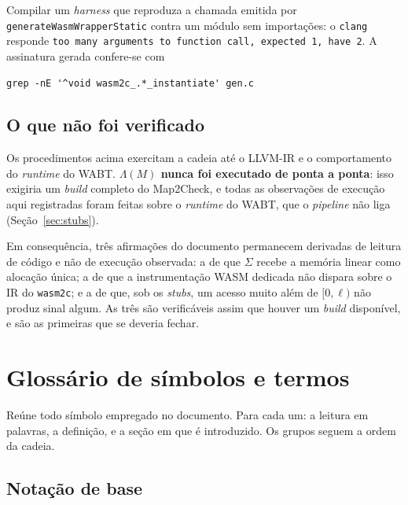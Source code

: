 \documentclass[11pt,a4paper]{article}
\theoremstyle{definition}
\newcommand{\code}[1]{\texttt{#1}}
\begin{document}
Compilar um \emph{harness} que reproduza a chamada emitida por
\code{generateWasmWrapperStatic} contra um módulo sem importações: o \code{clang}
responde \code{too many arguments to function call, expected 1, have 2}. A
assinatura gerada confere-se com

\begin{lstlisting}
grep -nE '^void wasm2c_.*_instantiate' gen.c
\end{lstlisting}

\subsection{O que não foi verificado}

Os procedimentos acima exercitam a cadeia até o LLVM-IR e o comportamento do
\emph{runtime} do WABT. \textbf{$\Lambda(M)$ nunca foi executado de ponta a
ponta}: isso exigiria um \emph{build} completo do Map2Check, e todas as
observações de execução aqui registradas foram feitas sobre o \emph{runtime} do
WABT, que o \emph{pipeline} não liga (Seção~\ref{sec:stubs}).

Em consequência, três afirmações do documento permanecem derivadas de leitura de
código e não de execução observada: a de que $\Sigma$ recebe a memória linear
como alocação única; a de que a instrumentação WASM dedicada não dispara sobre o
IR do \code{wasm2c}; e a de que, sob os \emph{stubs}, um acesso muito além de
$[0,\ell)$ não produz sinal algum. As três são verificáveis assim que houver um
\emph{build} disponível, e são as primeiras que se deveria fechar.

\section{Glossário de símbolos e termos}
\label{ap:glossario}

Reúne todo símbolo empregado no documento. Para cada um: a leitura em palavras, a
definição, e a seção em que é introduzido. Os grupos seguem a ordem da cadeia.

\subsection{Notação de base}
\end{document}
